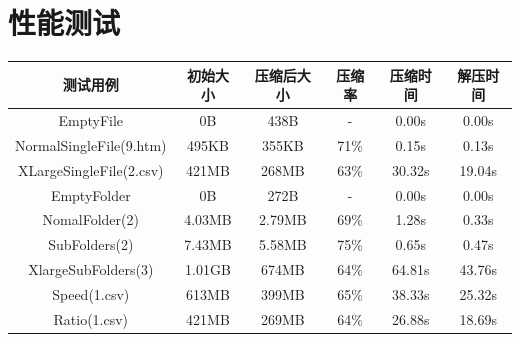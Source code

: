 \documentclass[11pt,a4paper]{article}
\begin{document}
\section{性能测试}
\begin{table}[h!]
    \begin{center}
        \begin{tabular}{|c|c|c|c|c|c|}
            \hline
            测试用例                & 初始大小 & 压缩后大小 & 压缩率 & 压缩时间 & 解压时间 \\
            \hline
            EmptyFile               & 0B       & 438B       & -      & 0.00s    & 0.00s    \\
            NormalSingleFile(9.htm) & 495KB    & 355KB      & 71\%   & 0.15s    & 0.13s    \\
            XLargeSingleFile(2.csv) & 421MB    & 268MB      & 63\%   & 30.32s   & 19.04s   \\
            EmptyFolder             & 0B       & 272B       & -      & 0.00s    & 0.00s    \\
            NomalFolder(2)          & 4.03MB   & 2.79MB     & 69\%   & 1.28s    & 0.33s    \\
            SubFolders(2)           & 7.43MB   & 5.58MB     & 75\%   & 0.65s    & 0.47s    \\
            XlargeSubFolders(3)     & 1.01GB   & 674MB      & 64\%   & 64.81s   & 43.76s   \\
            Speed(1.csv)            & 613MB    & 399MB      & 65\%   & 38.33s   & 25.32s   \\
            Ratio(1.csv)            & 421MB    & 269MB      & 64\%   & 26.88s   & 18.69s   \\
            \hline
        \end{tabular}
    \end{center}
\end{table}
\end{document}
